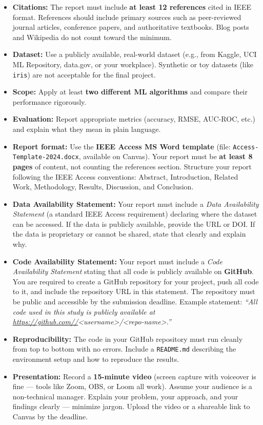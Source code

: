 \documentclass[
  10pt,
]{article}
\providecommand{\tightlist}{%
  \setlength{\itemsep}{0pt}\setlength{\parskip}{0pt}}
\begin{document}
\begin{itemize}
\tightlist
\item
  \textbf{Citations:} The report must include \textbf{at least 12
  references} cited in IEEE format. References should include primary
  sources such as peer-reviewed journal articles, conference papers, and
  authoritative textbooks. Blog posts and Wikipedia do not count toward
  the minimum.
\item
  \textbf{Dataset:} Use a publicly available, real-world dataset (e.g.,
  from Kaggle, UCI ML Repository, data.gov, or your workplace).
  Synthetic or toy datasets (like \texttt{iris}) are not acceptable for
  the final project.
\item
  \textbf{Scope:} Apply at least \textbf{two different ML algorithms}
  and compare their performance rigorously.
\item
  \textbf{Evaluation:} Report appropriate metrics (accuracy, RMSE,
  AUC-ROC, etc.) and explain what they mean in plain language.
\item
  \textbf{Report format:} Use the \textbf{IEEE Access MS Word template}
  (file: \texttt{Access-Template-2024.docx}, available on Canvas). Your
  report must be \textbf{at least 8 pages} of content, not counting the
  references section. Structure your report following the IEEE Access
  conventions: Abstract, Introduction, Related Work, Methodology,
  Results, Discussion, and Conclusion.
\item
  \textbf{Data Availability Statement:} Your report must include a
  \emph{Data Availability Statement} (a standard IEEE Access
  requirement) declaring where the dataset can be accessed. If the data
  is publicly available, provide the URL or DOI. If the data is
  proprietary or cannot be shared, state that clearly and explain why.
\item
  \textbf{Code Availability Statement:} Your report must include a
  \emph{Code Availability Statement} stating that all code is publicly
  available on \textbf{GitHub}. You are required to create a GitHub
  repository for your project, push all code to it, and include the
  repository URL in this statement. The repository must be public and
  accessible by the submission deadline. Example statement: \emph{``All
  code used in this study is publicly available at
  \url{https://github.com//}\textless username\textgreater/\textless repo-name\textgreater.''}
\item
  \textbf{Reproducibility:} The code in your GitHub repository must run
  cleanly from top to bottom with no errors. Include a
  \texttt{README.md} describing the environment setup and how to
  reproduce the results.
\item
  \textbf{Presentation:} Record a \textbf{15-minute video} (screen
  capture with voiceover is fine --- tools like Zoom, OBS, or Loom all
  work). Assume your audience is a non-technical manager. Explain your
  problem, your approach, and your findings clearly --- minimize jargon.
  Upload the video or a shareable link to Canvas by the deadline.
\end{itemize}
\end{document}
